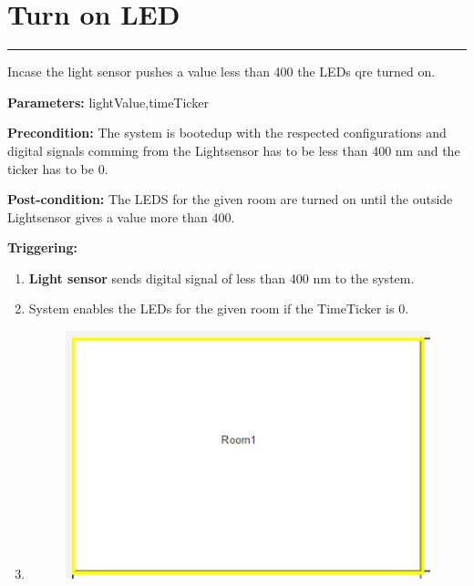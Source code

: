 \section{Turn on LED}

\hrule
\hfill
\vspace{0.5cm}
\label{operation:Turn on LED}

Incase the light sensor pushes a value less than 400 the LEDs qre turned on.
\begin{description}
\item \textbf{Parameters:} lightValue,timeTicker
\item \textbf{Precondition:} The system is bootedup with the respected
configurations and digital signals comming from the Lightsensor has to be less
than 400 nm and the ticker has to be 0.
\item \textbf{Post-condition:} The LEDS for the given room are turned on until
the outside Lightsensor gives a value more than 400.

\item \textbf{Triggering:}
\begin{enumerate}
\item \textbf{Light sensor} sends digital signal of less than 400 nm to the
system.
\item System enables the LEDs for the given room if the TimeTicker is 0.
\item \begin{figure}[H]
\includegraphics[width=1\textwidth]{images/LEDSON.eps}
\end{figure}
\end{enumerate}
\end{description}

